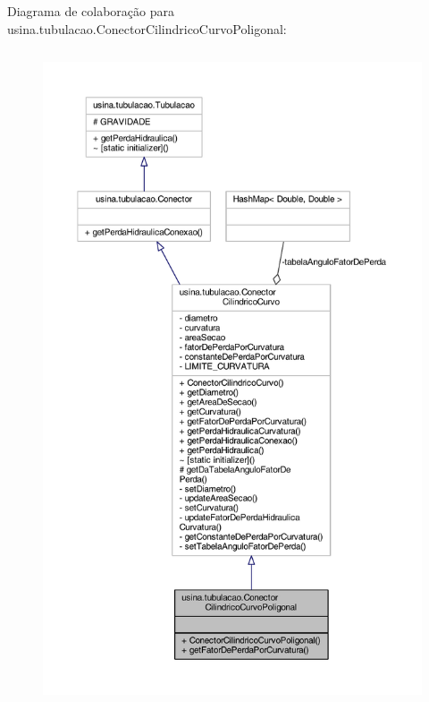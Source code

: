 Diagrama de colaboração para usina.\-tubulacao.\-Conector\-Cilindrico\-Curvo\-Poligonal\-:
\nopagebreak
\begin{figure}[H]
\begin{center}
\leavevmode
\includegraphics[height=550pt]{classusina_1_1tubulacao_1_1_conector_cilindrico_curvo_poligonal__coll__graph}
\end{center}
\end{figure}
